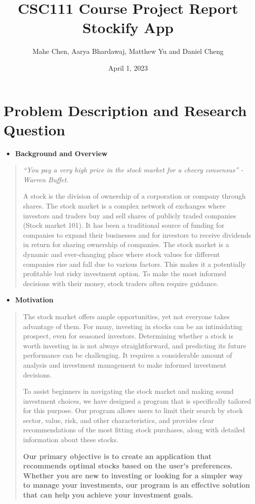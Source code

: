 \documentclass[fontsize=12pt]{article}
\title{%
  CSC111 Course Project Report \\
  \large Stockify App}
\author{Mahe Chen, Aarya Bhardawaj, Matthew Yu and Daniel Cheng}
\date{April 1, 2023}
\begin{document}
\maketitle

\section*{Problem Description and Research Question}

\begin{itemize}
\item

\textbf{Background and Overview}

\end{itemize}

\begin{quote}
\noindent \textit{“You pay a very high price in the stock market for a cheery consensus” - Warren Buffet.}

A stock is the division of ownership of a corporation or company through shares. The stock market is a complex network of exchanges where investors and traders buy and sell shares of publicly traded companies (Stock market 101). It has been a traditional source of funding for companies to expand their businesses and for investors to receive dividends in return for sharing ownership of companies. The stock market is a dynamic and ever-changing place where stock values for different companies rise and fall due to various factors. This makes it a potentially profitable but risky investment option. To make the most informed decisions with their money, stock traders often require guidance.
\end{quote}

\begin{itemize}
\item
  
  \textbf{Motivation}
 
\end{itemize}

\begin{quote}
\noindent The stock market offers ample opportunities, yet not everyone takes advantage of them. For many, investing in stocks can be an intimidating prospect, even for seasoned investors. Determining whether a stock is worth investing in is not always straightforward, and predicting its future performance can be challenging. It requires a considerable amount of analysis and investment management to make informed investment decisions.

To assist beginners in navigating the stock market and making sound investment choices, we have designed a program that is specifically tailored for this purpose. Our program allows users to limit their search by stock sector, value, risk, and other characteristics, and provides clear recommendations of the most fitting stock purchases, along with detailed information about these stocks.  

\textbf{Our primary objective is to create an application that recommends optimal stocks based on the user's preferences. Whether you are new to investing or looking for a simpler way to manage your investments, our program is an effective solution that can help you achieve your investment goals.}
\end{quote}
\end{document}
